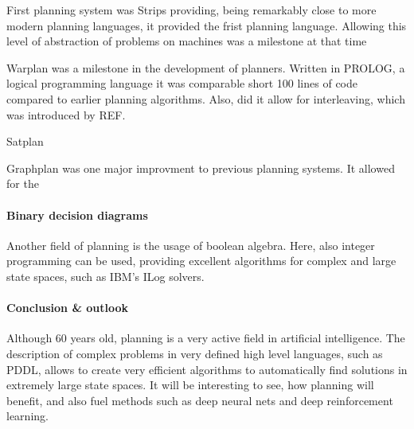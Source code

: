 \documentclass{article}
\begin{document}
First planning system was Strips providing, being remarkably close to more
modern planning languages, it provided the frist planning language. Allowing
this level of abstraction of problems on machines was a milestone at that time

Warplan was a milestone in the development of planners. Written in PROLOG, a
logical programming language it was comparable short 100 lines of code compared
to earlier planning algorithms. Also, did it allow for interleaving, which was
introduced by REF. 

Satplan

Graphplan was one major improvment to previous planning systems. It allowed for
the 

\paragraph*{Binary decision diagrams}

Another field of planning is the usage of boolean algebra. Here, also integer
programming can be used, providing excellent algorithms for complex and large
state spaces, such as IBM's ILog solvers.

\paragraph*{Conclusion \& outlook}

Although 60 years old, planning is a very active field in artificial
intelligence. The description of complex problems in very defined high level
languages, such as PDDL, allows to create very efficient algorithms to
automatically find solutions in extremely large state spaces. It will be
interesting to see, how planning will benefit, and also fuel methods such as
deep neural nets and deep reinforcement learning.

\printbibliography
\end{document}
